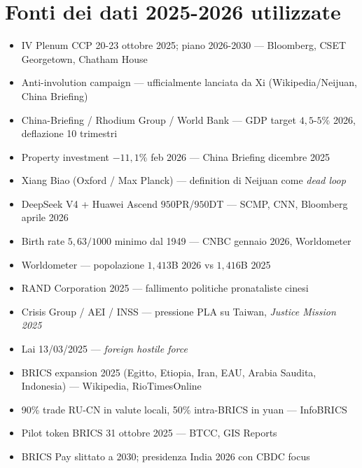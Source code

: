 \section{Fonti dei dati 2025-2026
utilizzate}\label{fonti-dei-dati-2025-2026-utilizzate}

\begin{itemize}
\tightlist
\item
  IV Plenum CCP 20-23 ottobre 2025; piano 2026-2030 --- Bloomberg, CSET
  Georgetown, Chatham House
\item
  Anti-involution campaign --- ufficialmente lanciata da Xi
  (Wikipedia/Neijuan, China Briefing)
\item
  China-Briefing / Rhodium Group / World Bank --- GDP target
  \(4{,}5\)-\(5\%\) 2026, deflazione 10 trimestri
\item
  Property investment \(-11{,}1\%\) feb 2026 --- China Briefing dicembre
  2025
\item
  Xiang Biao (Oxford / Max Planck) --- definition di Neijuan come
  \emph{dead loop}
\item
  DeepSeek V4 + Huawei Ascend \(950\)PR/\(950\)DT --- SCMP, CNN,
  Bloomberg aprile 2026
\item
  Birth rate \(5{,}63/1000\) minimo dal 1949 --- CNBC gennaio 2026,
  Worldometer
\item
  Worldometer --- popolazione \(1{,}413\)B 2026 vs \(1{,}416\)B 2025
\item
  RAND Corporation 2025 --- fallimento politiche pronataliste cinesi
\item
  Crisis Group / AEI / INSS --- pressione PLA su Taiwan, \emph{Justice
  Mission 2025}
\item
  Lai 13/03/2025 --- \emph{foreign hostile force}
\item
  BRICS expansion 2025 (Egitto, Etiopia, Iran, EAU, Arabia Saudita,
  Indonesia) --- Wikipedia, RioTimesOnline
\item
  90\% trade RU-CN in valute locali, 50\% intra-BRICS in yuan ---
  InfoBRICS
\item
  Pilot token BRICS 31 ottobre 2025 --- BTCC, GIS Reports
\item
  BRICS Pay slittato a 2030; presidenza India 2026 con CBDC focus
\end{itemize}


